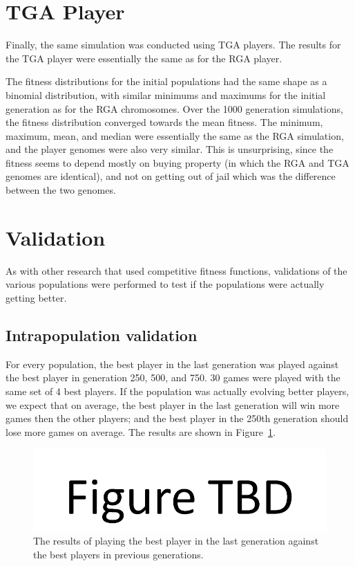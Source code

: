 \section{TGA Player}

Finally, the same simulation was conducted using TGA players. The results for
the TGA player were essentially the same as for the RGA player.

The fitness distributions for the initial populations had the same shape as a
binomial distribution, with similar minimums and maximums for the initial
generation as for the RGA chromosomes. Over the 1000 generation simulations, the
fitness distribution converged towards the mean fitness. The minimum, maximum,
mean, and median were essentially the same as the RGA simulation, and the player
genomes were also very similar. This is unsurprising, since the fitness seems to
depend mostly on buying property (in which the RGA and TGA genomes are
identical), and not on getting out of jail which was the difference between the
two genomes.

\section{Validation}

As with other research that used competitive fitness functions, validations of
the various populations were performed to test if the populations were actually
getting better.

\subsection{Intrapopulation validation}

For every population, the best player in the last generation was played against
the best player in generation 250, 500, and 750. 30 games were played with the
same set of 4 best players. If the population was actually evolving better
players, we expect that on average, the best player in the last generation will
win more games then the other players; and the best player in the 250th
generation should lose more games on average. The results are shown in
Figure~\ref{figure-intrapopulation}.

\begin{figure}[htp]
\centerline{\includegraphics[width=1.0\columnwidth]{Figures/figureTBD.png}}
\caption[Intrapopulation validation]{The results of playing the best player in
the last generation against the best players in previous generations.}
\label{figure-intrapopulation}
\end{figure}

